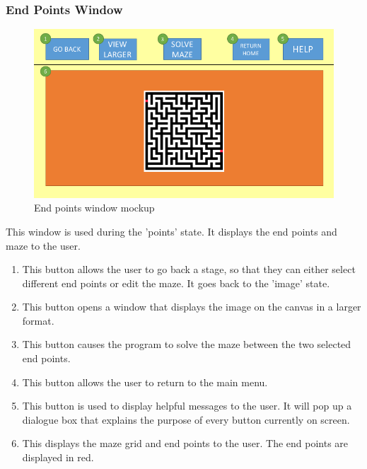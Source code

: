 \documentclass[titlepage]{article}
\begin{document}
\subsubsection{End Points Window}
\begin{figure}[H]
  \centering
  \includegraphics[width=12cm]{Slide4.png}
  \caption{End points window mockup}
  \label{fig:dijk}
\end{figure}
This window is used during the 'points' state. It displays the end points and maze to the user.
\begin{enumerate}
\item This button allows the user to go back a stage, so that they can either select different end points or edit the maze. It goes back to the 'image' state.
\item This button opens a window that displays the image on the canvas in a larger format. 
\item This button causes the program to solve the maze between the two selected end points.
\item This button allows the user to return to the main menu.
\item This button is used to display helpful messages to the user. It will pop up a dialogue box that explains the purpose of every button currently on screen.
\item This displays the maze grid and end points to the user. The end points are displayed in red.
\end{enumerate}
\end{document}
